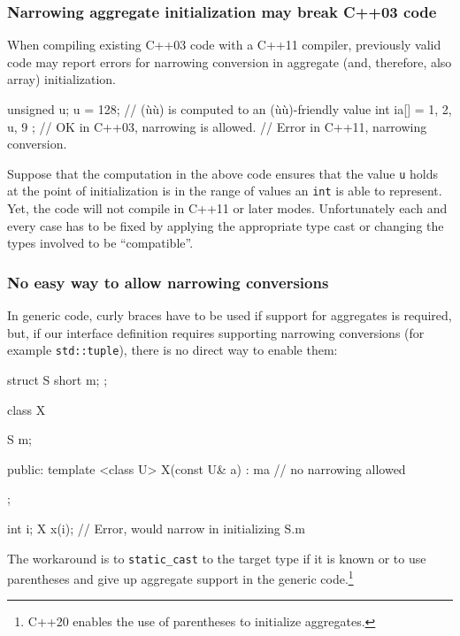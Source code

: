 \subsubsection[Narrowing aggregate initialization may break C++03 code]{Narrowing aggregate initialization may break C++03 code}\label{narrowing-aggregate-initialization-may-break-c++03-code}

When compiling existing C++03 code with a C++11 compiler, previously
valid code may report errors for narrowing conversion in aggregate (and,
therefore, also array) initialization.

\begin{emcppslisting}
unsigned u;
u = 128;                    // (ù{}ù) is computed to an (ù{}ù)-friendly value
int ia[] = { 1, 2, u, 9 };  // OK in C++03, narrowing is allowed.
                            // Error in C++11, narrowing conversion.
\end{emcppslisting}


\noindent Suppose that the computation in the above code ensures that the value
\lstinline!u! holds at the point of initialization is in the range of
values an \lstinline!int! is able to represent. Yet, the code will not
compile in C++11 or later modes. Unfortunately each and every case has
to be fixed by applying the appropriate type cast or changing the types
involved to be ``compatible''.

\subsubsection[No easy way to allow narrowing conversions]{No easy way to allow narrowing conversions}\label{no-easy-way-to-allow-narrowing-conversions}

In generic code, curly braces have to be used if support for aggregates
is required, but, if our interface definition requires supporting
narrowing conversions (for example \lstinline!std::tuple!), there is no
direct way to enable them:

\begin{emcppslisting}
struct S
{
    short m;
};

class X
{
    S m;

public:
    template <class U>
    X(const U& a) : m{a}  // no narrowing allowed
    {
    }
};

int i;
X x(i);  // Error, would narrow in initializing S.m
\end{emcppslisting}


\noindent The workaround is to \lstinline!static_cast! to the target type if it is
known or to use parentheses and give up aggregate support in the generic
code.{\cprotect\footnote{C++20 enables the use of parentheses to
  initialize aggregates.}}

